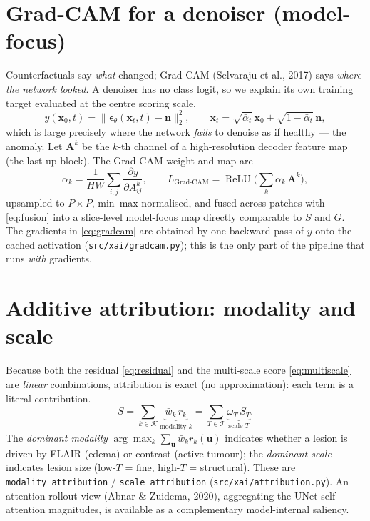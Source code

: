 \documentclass[12pt,a4paper]{article}
\newcommand{\x}{\bm{x}}
\newcommand{\eps}{\bm{\epsilon}}
\newcommand{\abar}{\bar{\alpha}}
\DeclareMathOperator{\ReLU}{ReLU}
\begin{document}
\section{Grad-CAM for a denoiser (model-focus)}
Counterfactuals say \emph{what} changed; Grad-CAM (Selvaraju et al., 2017) says
\emph{where the network looked}. A denoiser has no class logit, so we explain its
own training target evaluated at the centre scoring scale,
\begin{equation}
y(\x_0,t)=\big\|\eps_\theta(\x_t,t)-\bm n\big\|_2^2,
\qquad \x_t=\sqrt{\abar_t}\,\x_0+\sqrt{1-\abar_t}\,\bm n,
\label{eq:gradcam-target}
\end{equation}
which is large precisely where the network \emph{fails} to denoise as if healthy
--- the anomaly. Let $\bm A^{k}$ be the $k$-th channel of a high-resolution
decoder feature map (the last up-block). The Grad-CAM weight and map are
\begin{equation}
\alpha_k=\frac{1}{HW}\sum_{i,j}\frac{\partial y}{\partial A^{k}_{ij}},
\qquad
L_{\text{Grad-CAM}}=\ReLU\!\Big(\sum_k \alpha_k\,\bm A^{k}\Big),
\label{eq:gradcam}
\end{equation}
upsampled to $P\times P$, min--max normalised, and fused across patches with
\eqref{eq:fusion} into a slice-level model-focus map directly comparable to $S$
and $G$. The gradients in \eqref{eq:gradcam} are obtained by one backward pass of
$y$ onto the cached activation (\texttt{src/xai/gradcam.py}); this is the only
part of the pipeline that runs \emph{with} gradients.

\section{Additive attribution: modality and scale}
Because both the residual \eqref{eq:residual} and the multi-scale score
\eqref{eq:multiscale} are \emph{linear} combinations, attribution is exact (no
approximation): each term is a literal contribution.
\begin{equation}
S=\sum_{k\in\mathcal K}\underbrace{\bar w_k\, r_k}_{\text{modality } k}
=\sum_{T\in\mathcal T}\underbrace{\omega_T\,S_T}_{\text{scale } T}.
\end{equation}
The \emph{dominant modality} $\arg\max_k \sum_{\bm u}\bar w_k r_k(\bm u)$ indicates
whether a lesion is driven by FLAIR (edema) or contrast (active tumour); the
\emph{dominant scale} indicates lesion size (low-$T$ = fine, high-$T$ =
structural). These are \texttt{modality\_attribution} / \texttt{scale\_attribution}
(\texttt{src/xai/attribution.py}). An attention-rollout view (Abnar \& Zuidema,
2020), aggregating the UNet self-attention magnitudes, is available as a
complementary model-internal saliency.
\end{document}
